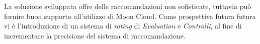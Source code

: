 \documentclass[10pt,a4paper]{article}
\begin{document}
%
La soluzione sviluppata offre delle raccomandazioni non sofisticate, tuttavia può fornire buon supporto all'utilizzo di Moon Cloud. Come prospettiva futura futura
vi è l'introduzione di un sistema di \textit{rating} di \textit{Evaluation} e \textit{Controlli}, al fine di incrementare la precisione del sistema di raccomandazione.
\end{document}
